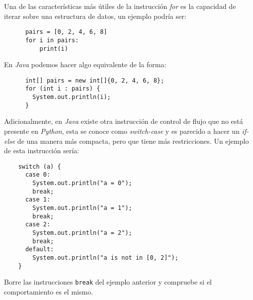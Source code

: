   Una de las características más útiles de la instrucción \textit{for} es la capacidad de
  iterar sobre una estructura de datos, un ejemplo podría ser:
  
  \begin{listing}[ht!]
    \begin{verbatim}
      pairs = [0, 2, 4, 6, 8]
      for i in pairs:
          print(i)
    \end{verbatim}    
  \end{listing}

  En \textit{Java} podemos hacer algo equivalente de la forma:

  \begin{listing}[ht!]
    \begin{verbatim}
      int[] pairs = new int[]{0, 2, 4, 6, 8};
      for (int i : pairs) {
        System.out.println(i);
      }
    \end{verbatim}
  \end{listing}

  
  Adicionalmente, en \textit{Java} existe otra instrucción de control de flujo que no está
  presente en \textit{Python}, esta se conoce como \textit{switch-case} y es parecido a 
  hacer un \textit{if-else} de una manera más compacta, pero que tiene más restricciones.
  Un ejemplo de esta instrucción sería:

  \begin{verbatim}
    switch (a) {
      case 0:
        System.out.println("a = 0");
        break;
      case 1:
        System.out.println("a = 1");
        break;
      case 2:
        System.out.println("a = 2");
        break;
      default:
        System.out.println("a is not in [0, 2]");
    }
  \end{verbatim}

  \begin{exercise}
    Borre las instrucciones \texttt{break} del ejemplo anterior y compruebe si 
    el comportamiento es el mismo.
  \end{exercise}
%